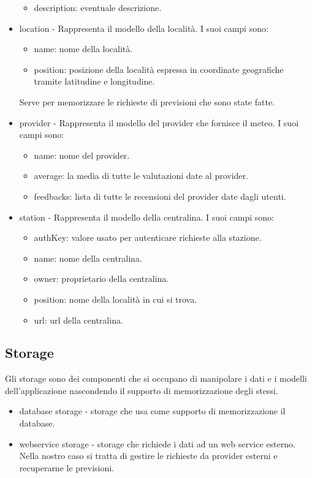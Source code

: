 \begin{itemize}
\begin{itemize}
    \item description: eventuale descrizione.
\end{itemize}
\item location - Rappresenta il modello della località. I suoi campi sono:
\begin{itemize}
    \item name: nome della località.
    \item position: posizione della località espressa in coordinate geografiche tramite latitudine e longitudine.
\end{itemize}
Serve per memorizzare le richieste di previsioni che sono state fatte.
\item provider - Rappresenta il modello del provider che fornisce il meteo. I suoi campi sono:
\begin{itemize}
    \item name: nome del provider.
    \item average: la media di tutte le valutazioni date al provider.
    \item feedbacks: lista di tutte le recensioni del provider date dagli utenti.
\end{itemize}
\item station - Rappresenta  il modello della centralina. I suoi campi sono:
\begin{itemize}
    \item authKey: valore usato per autenticare richieste alla stazione.
    \item name: nome della centralina.
    \item owner: proprietario della centralina.
    \item position: nome della località in cui si trova.
    \item url: url della centralina.
\end{itemize}
\end{itemize}

\subsection{Storage}
Gli storage sono dei componenti che si occupano di manipolare i dati e i modelli dell'applicazione nascondendo il supporto di memorizzazione degli stessi. 
\begin{itemize}
\item{database storage} - storage che usa come supporto di memorizzazione il database.
\item{webservice storage} - storage che richiede i dati ad un web service esterno. Nella nostro caso si tratta di gestire le richieste da provider esterni e recuperarne le previsioni.
\end{itemize}

